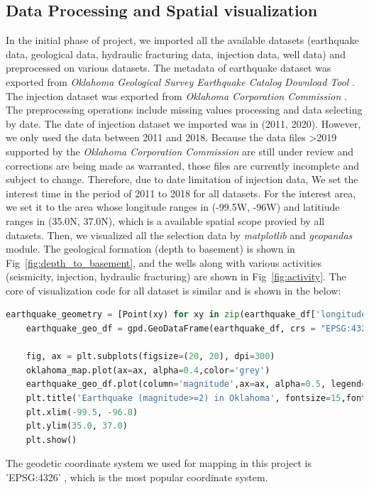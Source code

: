 \documentclass[final-report]{report-template}
\begin{document}
\subsection{Data Processing and Spatial visualization}
\label{sec:dpsv}

In the initial phase of project, we imported all the available datasets (earthquake data, geological data, hydraulic fracturing data, injection data, well data) and preprocessed on various datasets. 
The metadata of earthquake dataset was exported from \textit{Oklahoma Geological Survey Earthquake Catalog Download Tool} \citep{walter2020oklahoma}.
The injection dataset was exported from \textit{Oklahoma Corporation Commission} \citep{OklahomaCorporationCommission}.
The preprocessing operations include missing values processing and data selecting by date.
The date of injection dataset we imported was in (2011, 2020). However, we only used the data between 2011 and 2018. Because the data files \textgreater 2019 supported by the \textit{Oklahoma Corporation Commission} are still under review and corrections are being made as warranted, those files are currently incomplete and subject to change.
Therefore, due to date limitation of injection data, We set the interest time in the period of 2011 to 2018 for all datasets.
For the interest area, we set it to the area whose longitude ranges in (-99.5W, -96W) and latitiude ranges in (35.0N, 37.0N), which is a available spatial scope provied by all datasets.
Then, we visualized all the selection data by \textit{matplotlib} and \textit{geopandas} module. 
The geological formation (depth to basement) is shown in Fig~\ref{fig:depth_to_basement}, and the wells along with various activities (seismicity, injection, hydraulic fracturing) are shown in Fig~\ref{fig:activity}.
The core of visualization code for all dataset is similar and is shown in the below:

\begin{lstlisting}[language=Python]
    earthquake_geometry = [Point(xy) for xy in zip(earthquake_df['longitude'], earthquake_df['latitude'])]
    earthquake_geo_df = gpd.GeoDataFrame(earthquake_df, crs = "EPSG:4326", geometry = earthquake_geometry)

    fig, ax = plt.subplots(figsize=(20, 20), dpi=300)
    oklahoma_map.plot(ax=ax, alpha=0.4,color='grey')
    earthquake_geo_df.plot(column='magnitude',ax=ax, alpha=0.5, legend=True, markersize=10)
    plt.title('Earthquake (magnitude>=2) in Oklahoma', fontsize=15,fontweight='bold')
    plt.xlim(-99.5, -96.0)
    plt.ylim(35.0, 37.0)
    plt.show()
\end{lstlisting}
The geodetic coordinate system we used for mapping in this project is 'EPSG:4326' \citep{epsg}, which is the most popular coordinate system. 
\end{document}

